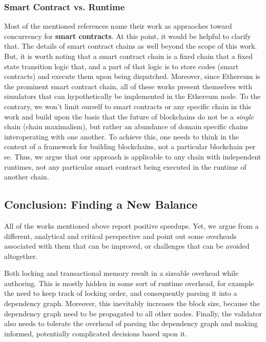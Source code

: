 
\subsubsection{Smart Contract vs. Runtime}

Most of the mentioned references name their work as appraoches toward concurrency for \textbf{smart
contracts}. At this point, it would be helpful to clarify that. The details of smart contract chains
as well beyond the scope of this work. But, it is worth noting that a smart contract chain is a
fixed chain that a fixed state transition logic that, and a part of that logic is to store codes
(smart contracts) and execute them upon being dispatched. Moreover, since Ethereum is the prominent
smart contract chain, all of these works present themselves with simulators that can hypothetically
be implemented in the Ethereum node. To the contrary, we won't limit ourself to smart contracts or
any specific chain in this work and build upon the basis that the future of blockchains do not be
a \textit{single} chain (chain maximalism), but rather an abundance of domain specific chains
interoperating with one another. To achieve this, one needs to think in the context of a framework
for building blockchains, not a particular blockchain per se. Thus, we argue that our approach is
applicable to any chain with independent runtimes, not any particular smart contract being executed
in the runtime of another chain.

\subsection{Conclusion: Finding a New Balance}

All of the works mentioned above report positive speedups. Yet, we argue from a different,
analytical and critical perspective and point out some overheads associated with them that can be
improved, or challenges that can be avoided altogether.

Both locking and transactional memory result in a sizeable overhead while authoring. This is
mostly hidden in some sort of runtime overhead, for example the need to keep track of locking order,
and consequently parsing it into a dependency graph. Moreover, this inevitably increases the
block size, because the dependency graph need to be propagated to all other nodes. Finally, the
validator also needs to tolerate the overhead of parsing the dependency graph and making informed,
potentially complicated decisions based upon it.

